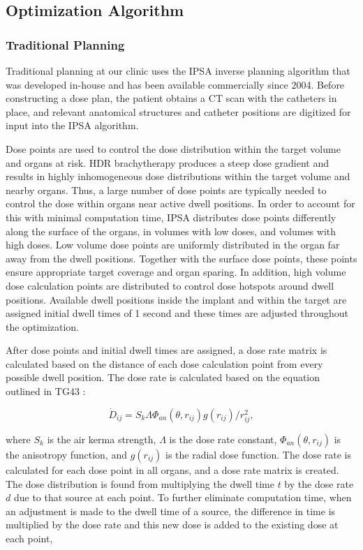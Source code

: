 \documentclass[osajnl,twocolumn,showpacs,superscriptaddress,10pt]{revtex4-1}
\begin{document}
\subsection{Optimization Algorithm}

\subsubsection{Traditional Planning}

Traditional planning at our clinic uses the IPSA inverse planning algorithm that was developed in-house and has been available commercially since 2004. Before constructing a dose plan, the patient obtains a CT scan with the catheters in place, and relevant anatomical structures and catheter positions are digitized for input into the IPSA algorithm. 

Dose points are used to control the dose distribution within the target volume and organs at risk. HDR brachytherapy produces a steep dose gradient and results in highly inhomogeneous dose distributions within the target volume and nearby organs. Thus, a large number of dose points are typically needed to control the dose within organs near active dwell positions. In order to account for this with minimal computation time, IPSA distributes dose points differently along the surface of the organs, in volumes with low doses, and volumes with high doses. Low volume dose points are uniformly distributed in the organ far away from the dwell positions. Together with the surface dose points, these points ensure appropriate target coverage and organ sparing. In addition, high volume dose calculation points are distributed to control dose hotspots around dwell positions. Available dwell positions inside the implant and within the target are assigned initial dwell times of 1 second and these times are adjusted throughout the optimization. 

After dose points and initial dwell times are assigned, a dose rate matrix is calculated based on the distance of each dose calculation point from every possible dwell position. The dose rate is calculated based on the equation outlined in TG43 \cite{tg43}: 

\begin{equation}\label{eq:doserate}
    \dot D_{ij} = S_k \Lambda \Phi_{an}(\theta, r_{ij})g(r_{ij})/r_{ij}^2,
\end{equation}

where $S_k$ is the air kerma strength, $\Lambda$ is the dose rate constant, $\Phi_{an}(\theta, r_{ij})$ is the anisotropy function, and $g(r_{ij})$ is the radial dose function. The dose rate is calculated for each dose point in all organs, and a dose rate matrix is created. The dose distribution is found from multiplying the dwell time $t$ by the dose rate $d$ due to that source at each point. To further eliminate computation time, when an adjustment is made to the dwell time of a source, the difference in time is multiplied by the dose rate and this new dose is added to the existing dose at each point,
\end{document}

